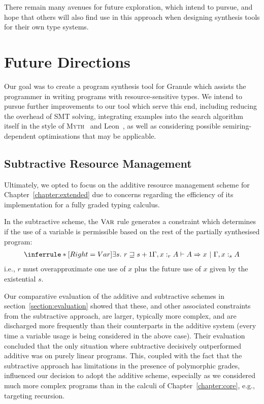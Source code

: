 There remain many avenues for future exploration, which intend to pursue, and
hope that others will also find use in this approach when designing synthesis
tools for their own type systems. 

\section{Future Directions}
\label{section:future}

Our goal was to create a program synthesis tool for Granule which assists the
programmer in writing programs with resource-sensitive types. We intend to
pursue further improvements to our tool which serve this end, including reducing
the overhead of SMT solving, integrating examples into the search algorithm
itself in the style of \textsc{Myth}~\citep{oseraMYTH1} and
Leon~\citep{10.1145/2509136.2509555}, as well as considering possible
semiring-dependent optimisations that may be applicable.

\subsection{Subtractive Resource Management}
Ultimately, we opted to focus on the additive resource management scheme for
Chapter~\ref{chapter:extended} due to concerns regarding the efficiency of its
implementation for a fully graded typing calculus.

In the subtractive scheme, the $\textsc{Var}$ rule generates a constraint which
determines if the use of a variable is permissible based on the rest of the
partially synthesised program:
\begin{align*}
  \inferrule*[Right=Var]
  {\exists s .\ r \sqsupseteq s + 1}
  {\Gamma, x :_{r} A \vdash A \Rightarrow x\ |\ \Gamma, x :_{s} A}
\end{align*}
i.e., $r$ must overapproximate one use of $x$ plus the future use of
$x$ given by the existential $s$.

Our comparative evaluation of the additive and subtractive schemes in
section~\ref{section:evaluation} showed that these, and other associated
constraints from the subtractive approach, are larger, typically more complex,
and are discharged more frequently than their counterparts in the additive
system (every time a variable usage is being considered in the above case).
Their evaluation concluded that the only situation where subtractive decisively
outperformed additive was on purely linear programs. This, coupled with the fact
that the subtractive approach has limitations in the presence of polymorphic
grades, influenced our decision to adopt the additive scheme, especially as we
considered much more complex programs than in the calculi of
Chapter~\ref{chapter:core}, e.g., targeting recursion.

